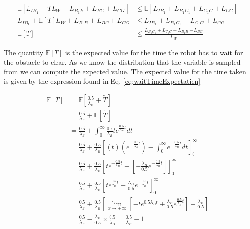 \documentclass[a4paper,12pt]{article}
\begin{document}
			\begin{equation}
				\begin{split}
					\mathbb{E}\left[L_{IB_{1}} + TL_W + L_{B_{1}B} + L_{BC} + L_{CG}\right] & \leq \mathbb{E}\left[L_{IB_{1}} + L_{B_{1}C_{1}} + L_{C_{1}C} + L_{CG}\right] \\
					L_{IB_{1}} + \mathbb{E}\left[T\right] L_W + L_{B_{1}B} + L_{BC} + L_{CG} & \leq L_{IB_{1}} + L_{B_{1}C_{1}} + L_{C_{1}C} + L_{CG} \\
					\mathbb{E}\left[T\right] & \leq \frac{L_{B_{1}C_{1}} + L_{C_{1}C} - L_{B_{1}B} - L_{BC}}{L_W}
				\end{split}
				\label{eq:costExpectation1}
			\end{equation}

			The quantity $\mathbb{E}\left[T\right]$ is the expected value for the time the robot has to wait for the obstacle to clear. As we know the distribution that the variable is sampled from we can compute the expected value. The expected value for the time taken is given by the expression found in Eq. \ref{eq:waitTimeExpectation}

			\begin{equation}
				\begin{split}
					\mathbb{E}\left[T\right] & = \mathbb{E}\left[\frac{0.5}{\lambda_{B}}+\widetilde{T}\right] \\
					& = \frac{0.5}{\lambda_{B}} + \mathbb{E}\left[\widetilde{T}\right] \\
					& = \frac{0.5}{\lambda_{B}} + \int_{0}^{\infty}\frac{0.5}{\lambda_{B}}te^{\frac{0.5}{\lambda_{B}}t} dt \\
					& = \frac{0.5}{\lambda_{B}} + \frac{0.5}{\lambda_{B}}\left[\left(t\right) \left(e^{-\frac{0.5}{\lambda_{B}}t}\right) - \int_{0}^{\infty}e^{-\frac{0.5}{\lambda_{B}}t} dt \right]_{0}^{\infty}\\
					& = \frac{0.5}{\lambda_{B}} + \frac{0.5}{\lambda_{B}}\left[te^{-\frac{0.5}{\lambda_{B}}t} - \left[-\frac{\lambda_{B}}{0.5}e^{-\frac{0.5}{\lambda_{B}}t}\right]\right]_{0}^{\infty} \\
					& = \frac{0.5}{\lambda_{B}} + \frac{0.5}{\lambda_{B}}\left[te^{\frac{0.5}{\lambda_{B}}t} + \frac{\lambda_{B}}{0.5}e^{-\frac{0.5}{\lambda_{B}}t}\right]_{0}^{\infty} \\
					& = \frac{0.5}{\lambda_{B}} + \frac{0.5}{\lambda_{B}}\left[\lim_{x \to +\infty} \left[-te^{0.5\lambda_{B}t} + \frac{\lambda_{B}}{0.5}e^{\frac{0.5}{\lambda_{B}}t}\right] - \frac{\lambda_{B}}{0.5}\right] \\
					& = \frac{0.5}{\lambda_{B}} - \frac{\lambda_{B}}{0.5}\times \frac{0.5}{\lambda_{B}} = \frac{0.5}{\lambda_{B}}-1
				\end{split}
				\label{eq:waitTimeExpectation}
			\end{equation}
\end{document}
